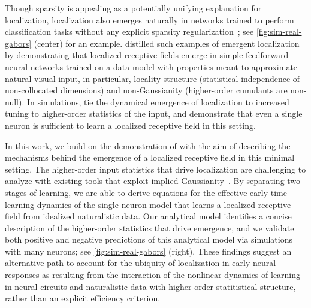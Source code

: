 Though sparsity is appealing as a potentially unifying explanation for localization, localization also emerges naturally in networks trained to perform classification tasks without any explicit sparsity regularization~\parencite{krizhevsky2012imagenet,zeiler2013visualizing,yosinski2015understanding,sengupta2018manifoldtiling}; see \cref{fig:sim-real-gabors} (center) for an example.
\textcite{ingrosso2022data} distilled such examples of emergent localization by demonstrating that localized receptive fields emerge in simple feedforward neural networks trained on a data model with properties meant to approximate natural visual input, in particular,
locality structure (statistical independence of non-collocated dimensions)
and non-Gaussianity (higher-order cumulants are non-null).
In simulations, \textcite{ingrosso2022data} tie the dynamical emergence of localization to increased tuning to higher-order statistics of the input, and demonstrate that even a single neuron is sufficient to learn a localized receptive field in this setting.

In this work, we build on the demonstration of \textcite{ingrosso2022data} with the aim of describing the mechanisms behind the emergence of a localized receptive field in this minimal setting.
The higher-order input statistics that drive localization are challenging to analyze with existing tools that exploit implied Gaussianity~\parencite{goldt2020modelling}.
By separating two stages of learning, we are able to derive equations for the effective early-time learning dynamics of the single neuron model that learns a localized receptive field from idealized naturalistic data.
Our analytical model identifies a concise description of the higher-order statistics that drive emergence, 
and we validate both positive and negative predictions of this analytical model via simulations with many neurons; see \cref{fig:sim-real-gabors} (right).
These findings suggest an alternative path to account for the ubiquity of localization in early neural responses as resulting from the interaction of the nonlinear dynamics of learning in neural circuits and naturalistic data with higher-order statitistical structure,
rather than an explicit efficiency criterion.
